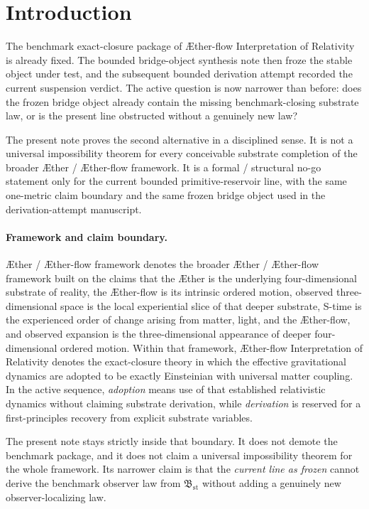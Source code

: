 \documentclass[11pt]{article}
\newcommand{\Aether}{\AE{}ther}
\newcommand{\Aflow}{\AE{}ther-flow}
\newcommand{\TheoryName}{\Aflow{} Interpretation of Relativity}
\newcommand{\TheoryProgram}{\Aether{} / \Aflow{} framework}
\newcommand{\StableBridgeObject}{\mathfrak B_{\mathrm{st}}}
\begin{document}
\section{Introduction}

The benchmark exact-closure package of \TheoryName{} is already fixed. The bounded bridge-object synthesis note then froze the stable object under test, and the subsequent bounded derivation attempt recorded the current suspension verdict. The active question is now narrower than before: does the frozen bridge object already contain the missing benchmark-closing substrate law, or is the present line obstructed without a genuinely new law?

The present note proves the second alternative in a disciplined sense. It is not a universal impossibility theorem for every conceivable substrate completion of the broader \Aether{} / \Aflow{} framework. It is a formal / structural no-go statement only for the current bounded primitive-reservoir line, with the same one-metric claim boundary and the same frozen bridge object used in the derivation-attempt manuscript.

\paragraph{Framework and claim boundary.}
\TheoryProgram{} denotes the broader \Aether{} / \Aflow{} framework built on the claims that the \Aether{} is the underlying four-dimensional substrate of reality, the \Aflow{} is its intrinsic ordered motion, observed three-dimensional space is the local experiential slice of that deeper substrate, S-time is the experienced order of change arising from matter, light, and the \Aflow{}, and observed expansion is the three-dimensional appearance of deeper four-dimensional ordered motion. Within that framework, \TheoryName{} denotes the exact-closure theory in which the effective gravitational dynamics are adopted to be exactly Einsteinian with universal matter coupling. In the active sequence, \emph{adoption} means use of that established relativistic dynamics without claiming substrate derivation, while \emph{derivation} is reserved for a first-principles recovery from explicit substrate variables.

The present note stays strictly inside that boundary. It does not demote the benchmark package, and it does not claim a universal impossibility theorem for the whole framework. Its narrower claim is that the \emph{current line as frozen} cannot derive the benchmark observer law from \(\StableBridgeObject\) without adding a genuinely new observer-localizing law.
\end{document}
